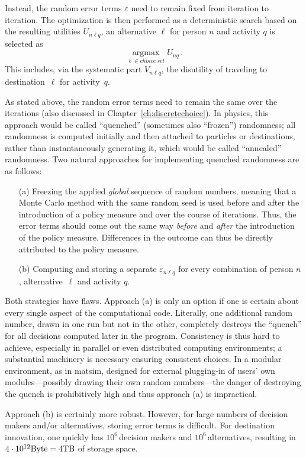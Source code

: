 Instead, the random error terms $\varepsilon$ need to remain fixed from iteration to iteration. 
The optimization is then performed as a deterministic search based on the resulting utilities $U_{n\ell q}$, \ie an alternative $\ell$ for person $n$ and activity $q$ is selected as 
\[ 
\underset{\ell \in choice\: set}{\operatorname{argmax}} U_{nq} \,.
\] 
This includes, via the systematic part $V_{n\ell q}$, the disutility of traveling to destination~$\ell$ for activity~$q$.

As stated above, the random error terms need to remain the same over the iterations (also discussed in Chapter~\ref{ch:discretechoice}). 
In physics, this approach would be called ``quenched'' (sometimes also ``frozen'') randomness; all randomness is computed initially and then attached to particles or destinations, rather than instantaneously generating it, which would be called ``annealed'' randomness. 
Two natural approaches for implementing quenched randomness are as follows:
%
\begin{itemize}\styleItemize
\item[(a)] Freezing the applied \emph{global} sequence of random numbers, meaning that a Monte Carlo method with the same random seed is used before and after the introduction of a policy measure and over the course of iterations. Thus, the error terms should come out the same way \emph{before} and \emph{after} the introduction of the policy measure. Differences in the outcome can thus be directly attributed to the policy measure. 
\item[(b)] Computing and storing a separate $\varepsilon_{n\ell q}$ for every combination of person $n$, alternative~$\ell$ and activity $q$.
\end{itemize}
 
Both strategies have flaws. 
Approach (a) is only an option if one is certain about every single aspect of the computational code. 
Literally, one additional random number, drawn in one run but not in the other, completely destroys the ``quench'' for all decisions computed later in the program. Consistency is thus hard to achieve, especially in parallel or even distributed computing environments; a substantial machinery is necessary ensuring consistent choices. 
In a modular environment, as in \gls{matsim}, designed for external plugging-in of users' own modules---possibly drawing their own random numbers---the danger of destroying the quench is prohibitively high and thus approach (a) is impractical.

Approach (b) is certainly more robust. 
However, for large numbers of decision makers and/or alternatives, storing error terms is difficult. 
For destination innovation, one quickly has $10^6$\,decision makers and $10^6$\,alternatives, resulting in $4 \cdot 10^{12} \hbox{Byte} = 4 \hbox{TB}$ of storage space.


